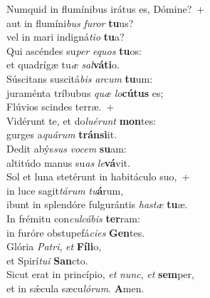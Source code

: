 \evenverse Numquid in flumínibus irátus es, Dómine?~+\\\evenverse  aut in flumíni\textit{bus} \textit{fu}\textit{ror} \textbf{tu}us?~\*\\
\evenverse vel in mari indigná\textit{ti}\textit{o} \textbf{tu}a?\\
\oddverse Qui ascéndes su\textit{per} \textit{e}\textit{quos} \textbf{tu}os:~\*\\
\oddverse et quadrígæ tu\textit{æ} \textit{sal}\textbf{vá}\textbf{ti}o.\\
\evenverse Súscitans suscitá\textit{bis} \textit{ar}\textit{cum} \textbf{tu}um:~\*\\
\evenverse juraménta tríbubus \textit{quæ} \textit{lo}\textbf{cú}\textbf{tus} es;\\
\oddverse Flúvios scindes terræ.~+\\
\oddverse  Vidérunt te, et do\textit{lu}\textit{é}\textit{runt} \textbf{mon}tes:~\*\\
\oddverse gurges a\textit{quá}\textit{rum} \textbf{trán}\textbf{si}it.\\
\evenverse Dedit abýs\textit{sus} \textit{vo}\textit{cem} \textbf{su}am:~\*\\
\evenverse altitúdo manus su\textit{as} \textit{le}\textbf{vá}vit.\\
\oddverse Sol et luna stetérunt in habitáculo suo,~+\\
\oddverse  in luce sagit\textit{tá}\textit{rum} \textit{tu}\textbf{á}rum,~\*\\
\oddverse ibunt in splendóre fulgurántis \textit{ha}\textit{stæ} \textbf{tu}æ.\\
\evenverse In frémitu con\textit{cul}\textit{cá}\textit{bis} \textbf{ter}ram:~\*\\
\evenverse in furóre obstupefá\textit{ci}\textit{es} \textbf{Gen}tes.\\
\oddverse Glória \textit{Pa}\textit{tri}, \textit{et} \textbf{Fí}\textbf{li}o,~\*\\
\oddverse et Spirí\textit{tu}\textit{i} \textbf{San}cto.\\
\evenverse Sicut erat in princípio, \textit{et} \textit{nunc}, \textit{et} \textbf{sem}per,~\*\\
\evenverse et in sǽcula sæcu\textit{ló}\textit{rum}. \textbf{A}men.\\
